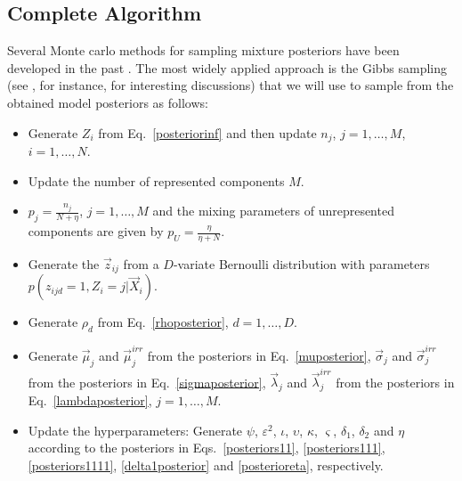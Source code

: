 \documentclass[journal,10pt]{elsart}
\begin{document}
\subsection{Complete Algorithm}\label{algorithm}
Several Monte carlo methods for sampling mixture posteriors have been developed in the past \cite{Ghosh2006,Robert2007}. The most widely applied approach is the Gibbs sampling (see \cite{dis}, for instance, for interesting discussions) that we will use to sample from the obtained model posteriors as follows:
\begin{itemize}
\item Generate $Z_i$ from Eq.~\ref{posteriorinf} and then update $n_j$, $j=1,\ldots,M$,
$i=1,\ldots,N$.
\item Update the number of represented components $M$.
\item $p_j=\frac{n_j}{N+\eta}$, $j=1,\ldots,M$ and the mixing parameters of unrepresented components are given by
$p_U=\frac{\eta}{\eta+N}$.
\item Generate the $\vec{z}_{ij}$ from a $D$-variate Bernoulli distribution with parameters $p(z_{ijd}=1,Z_i=j|\vec{X}_i)$.
\item Generate $\rho_d$ from Eq.~\ref{rhoposterior}, $d=1,\ldots,D$.
\item Generate $\vec{\mu}_{j}$ and $\vec{\mu}_{j}^{irr}$ from the posteriors in Eq.~\ref{muposterior}, $\vec{\sigma}_j$ and $\vec{\sigma}_j^{irr}$
from the posteriors in Eq.~\ref{sigmaposterior}, $\vec{\lambda}_j$ and $\vec{\lambda}_j^{irr}$ from the posteriors in Eq.~\ref{lambdaposterior}, $j=1,\ldots,M$.
\item Update the hyperparameters: Generate $\psi$, $\varepsilon^2$, $\iota$, $\upsilon$, $\kappa$, $\varsigma$, $\delta_1$, $\delta_2$ and $\eta$ according to the posteriors in Eqs.~\ref{posteriors11}, \ref{posteriors111}, \ref{posteriors1111}, \ref{delta1posterior} and \ref{posterioreta}, respectively.
\end{itemize}
\end{document}
